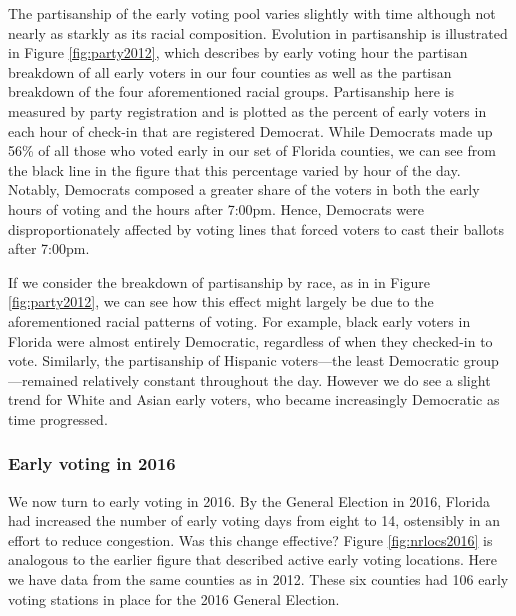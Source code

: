 \documentclass[12pt,titlepage]{article}
\begin{document}
The partisanship of the early voting pool varies slightly with time
although not nearly as starkly as its racial composition.  Evolution
in partisanship is illustrated in Figure \ref{fig:party2012}, which
describes by early voting hour the partisan breakdown of all early
voters in our four counties as well as the partisan breakdown of the
four aforementioned racial groups.  Partisanship here is measured by
party registration and is plotted as the percent of early voters in
each hour of check-in that are registered Democrat.  While Democrats
made up 56\% of all those who voted early in our set of Florida
counties, we can see from the black line in the figure that this
percentage varied by hour of the day.  Notably, Democrats composed a
greater share of the voters in both the early hours of voting and the
hours after 7:00pm.  Hence, Democrats were disproportionately affected
by voting lines that forced voters to cast their ballots after 7:00pm.


If we consider the breakdown of partisanship by race, as in in Figure
\ref{fig:party2012}, we can see how this effect might largely be due
to the aforementioned racial patterns of voting.  For example, black
early voters in Florida were almost entirely Democratic, regardless of
when they checked-in to vote.  Similarly, the partisanship of Hispanic
voters---the least Democratic group---remained relatively constant
throughout the day.  However we do see a slight trend for White and
Asian early voters, who became increasingly Democratic as time
progressed.


\subsubsection*{Early voting in 2016}

We now turn to early voting in 2016.  By the General Election in 2016,
Florida had increased the number of early voting days from eight to
14, ostensibly in an effort to reduce congestion. Was this change
effective?  Figure \ref{fig:nrlocs2016} is analogous to the earlier
figure that described active early voting locations.  Here we have
data from the same counties as in 2012.  These six counties had 106
early voting stations in place for the 2016 General Election.

\end{document}
